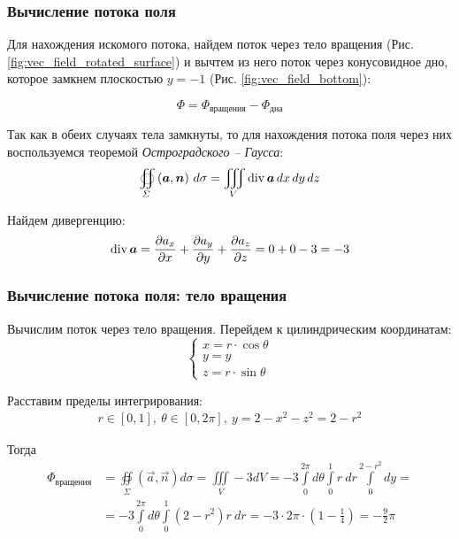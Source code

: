 \begin{frame}\frametitle{Вычисление потока поля}
	Для нахождения искомого потока, найдем поток через тело вращения
  (Рис. \ref{fig:vec_field_rotated_surface}) и вычтем из него поток
  через конусовидное дно, которое замкнем плоскостью \(y = -1\) (Рис. \ref{fig:vec_field_bottom}):

	\begin{equation*}
		\Phi = \Phi_{\text{вращения}} - \Phi_{\text{дна}}
	\end{equation*}

  Так как в обеих случаях тела замкнуты, то для нахождения
  потока поля через них воспользуемся теоремой \textit{Остроградского -- Гаусса}:
	\begin{equation*}
		\oiint\limits_{\Sigma}\left( \vec {a}, \vec {n} \right) \, d\sigma = \iiint\limits_V \Div \vec {a} \, dx \, dy \, dz
	\end{equation*}

	Найдем дивергенцию:
	\begin{equation*}
		\Div \vec a = \frac{\partial a_x}{\partial x} +  \frac{\partial a_y}{\partial y} +  \frac{\partial a_z}{\partial z} = 0 + 0 - 3 = -3
	\end{equation*}
\end{frame}

\begin{frame}\frametitle{Вычисление потока поля: тело вращения}
  Вычислим поток через тело вращения.
  Перейдем к цилиндрическим координатам:
  \begin{equation*}
		\begin{cases}
			x = r \cdot \cos \theta \\
			y = y                   \\
			z = r \cdot \sin \theta
		\end{cases}
	\end{equation*}

Расставим пределы интегрирования:
	\begin{align*}
		r \in [0, 1], \
		\theta \in [0, 2\pi], \
		y = 2 - x^2 - z^2 = 2 - r^2
	\end{align*}
	
	Тогда
	\begin{align*}
    \Phi_{\text{вращения}} &= \oiint\limits_{\Sigma}\left( \vec {a}, \vec {n} \right) d\sigma = \iiint\limits_V -3 dV
		= -3 \int\limits_{0}^{2 \pi} d \theta
		\int\limits_{0}^{1} r~dr
		\int\limits_{0}^{2-r^2} dy = \\
    &= -3 \int\limits_{0}^{2 \pi} d \theta
		\int\limits_{0}^{1} (2-r^2)r~dr
		= -3 \cdot 2 \pi \cdot
		\left(1 - \frac{1}{4}\right)
		= - \frac{9}{2}\pi
	\end{align*}
\end{frame}

